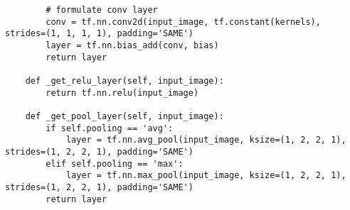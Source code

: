 \begin{spacing}{1}
\begin{lstlisting}
        # formulate conv layer
        conv = tf.nn.conv2d(input_image, tf.constant(kernels), strides=(1, 1, 1, 1), padding='SAME')
        layer = tf.nn.bias_add(conv, bias)
        return layer

    def _get_relu_layer(self, input_image):
        return tf.nn.relu(input_image)

    def _get_pool_layer(self, input_image):
        if self.pooling == 'avg':
            layer = tf.nn.avg_pool(input_image, ksize=(1, 2, 2, 1), strides=(1, 2, 2, 1), padding='SAME')
        elif self.pooling == 'max':
            layer = tf.nn.max_pool(input_image, ksize=(1, 2, 2, 1), strides=(1, 2, 2, 1), padding='SAME')
        return layer

\end{lstlisting}
\end{spacing}
